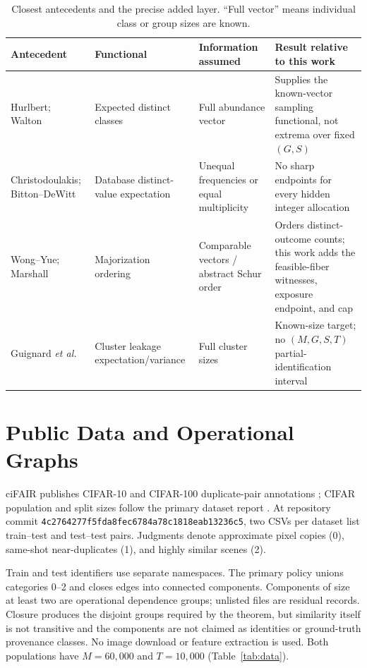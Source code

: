 \documentclass[conference,10pt]{IEEEtran}
\begin{document}
\begin{table}[t]
\caption{Closest antecedents and the precise added layer. ``Full vector'' means individual class or group sizes are known.}
\label{tab:antecedents}
\centering
\setlength{\tabcolsep}{4pt}
\begin{tabular}{p{}p{}p{}p{}}
\toprule
Antecedent & Functional & Information assumed & Result relative to this work\\
\midrule
Hurlbert; Walton \cite{hurlbert1971,walton1986} & Expected distinct classes & Full abundance vector & Supplies the known-vector sampling functional, not extrema over fixed $(G,S)$\\
Christodoulakis; Bitton--DeWitt \cite{christodoulakis1989,bitton1983} & Database distinct-value expectation & Unequal frequencies or equal multiplicity & No sharp endpoints for every hidden integer allocation\\
Wong--Yue; Marshall \cite{wong1973,marshall2011} & Majorization ordering & Comparable vectors / abstract Schur order & Orders distinct-outcome counts; this work adds the feasible-fiber witnesses, exposure endpoint, and cap\\
Guignard \emph{et al.} \cite{guignard2024} & Cluster leakage expectation/variance & Full cluster sizes & Known-size target; no $(M,G,S,T)$ partial-identification interval\\
\bottomrule
\end{tabular}
\end{table}

\section{Public Data and Operational Graphs}
ciFAIR publishes CIFAR-10 and CIFAR-100 duplicate-pair annotations \cite{barz2020,cifairmeta}; CIFAR population and split sizes follow the primary dataset report \cite{krizhevsky2009}. At repository commit \texttt{4c2764277f5fda8fec6784a78c1818eab13236c5}, two CSVs per dataset list train--test and test--test pairs. Judgments denote approximate pixel copies (0), same-shot near-duplicates (1), and highly similar scenes (2).

Train and test identifiers use separate namespaces. The primary policy unions categories 0--2 and closes edges into connected components. Components of size at least two are operational dependence groups; unlisted files are residual records. Closure produces the disjoint groups required by the theorem, but similarity itself is not transitive and the components are not claimed as identities or ground-truth provenance classes. No image download or feature extraction is used. Both populations have $M=60{,}000$ and $T=10{,}000$ (Table~\ref{tab:data}).
\end{document}
